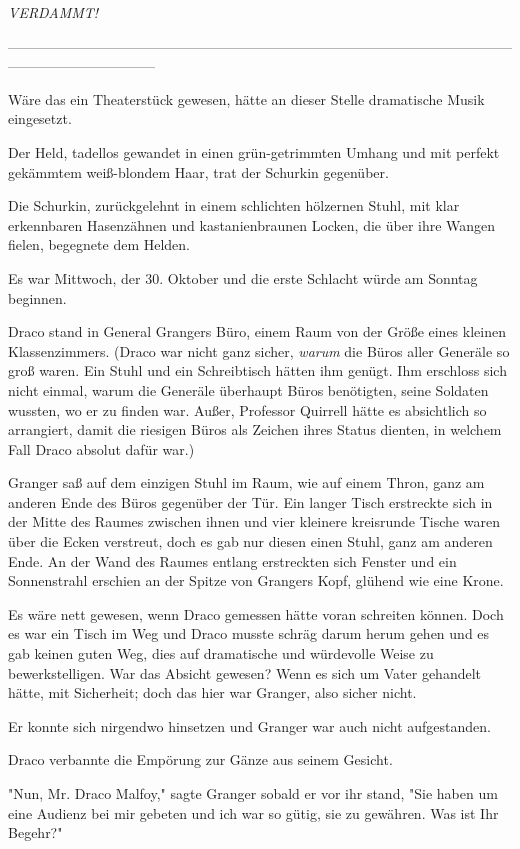 {\emph{VERDAMMT!}

--------------------------------------------------------------------------------------------------------------------------------------------

Wäre das ein Theaterstück gewesen, hätte an dieser Stelle dramatische Musik eingesetzt.

Der Held, tadellos gewandet in einen grün-getrimmten Umhang und mit perfekt gekämmtem weiß-blondem Haar, trat der Schurkin gegenüber.

Die Schurkin, zurückgelehnt in einem schlichten hölzernen Stuhl, mit klar erkennbaren Hasenzähnen und kastanienbraunen Locken, die über ihre Wangen fielen, begegnete dem Helden.

Es war Mittwoch, der 30. Oktober und die erste Schlacht würde am Sonntag beginnen.

Draco stand in General Grangers Büro, einem Raum von der Größe eines kleinen Klassenzimmers. (Draco war nicht ganz sicher, \emph{warum} die Büros aller Generäle so groß waren. Ein Stuhl und ein Schreibtisch hätten ihm genügt. Ihm erschloss sich nicht einmal, warum die Generäle überhaupt Büros benötigten, seine Soldaten wussten, wo er zu finden war. Außer, Professor Quirrell hätte es absichtlich so arrangiert, damit die riesigen Büros als Zeichen ihres Status dienten, in welchem Fall Draco absolut dafür war.)

Granger saß auf dem einzigen Stuhl im Raum, wie auf einem Thron, ganz am anderen Ende des Büros gegenüber der Tür. Ein langer Tisch erstreckte sich in der Mitte des Raumes zwischen ihnen und vier kleinere kreisrunde Tische waren über die Ecken verstreut, doch es gab nur diesen einen Stuhl, ganz am anderen Ende. An der Wand des Raumes entlang erstreckten sich Fenster und ein Sonnenstrahl erschien an der Spitze von Grangers Kopf, glühend wie eine Krone.

Es wäre nett gewesen, wenn Draco gemessen hätte voran schreiten können. Doch es war ein Tisch im Weg und Draco musste schräg darum herum gehen und es gab keinen guten Weg, dies auf dramatische und würdevolle Weise zu bewerkstelligen. War das Absicht gewesen? Wenn es sich um Vater gehandelt hätte, mit Sicherheit; doch das hier war Granger, also sicher nicht.

Er konnte sich nirgendwo hinsetzen und Granger war auch nicht aufgestanden.

Draco verbannte die Empörung zur Gänze aus seinem Gesicht.

"Nun, Mr. Draco Malfoy," sagte Granger sobald er vor ihr stand, "Sie haben um eine Audienz bei mir gebeten und ich war so gütig, sie zu gewähren. Was ist Ihr Begehr?"

}
